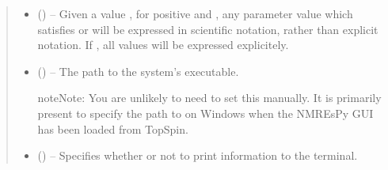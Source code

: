 \documentclass[letterpaper,10pt,english]{sphinxmanual}
\begin{document}
\begin{fulllineitems}
\begin{quote}
\begin{description}
\begin{itemize}
\item {} 
\sphinxAtStartPar
{} (\sphinxstyleliteralemphasis{\sphinxupquote{(}}\sphinxstyleliteralemphasis{\sphinxupquote{, }}\sphinxstyleliteralemphasis{\sphinxupquote{, }}\sphinxstyleliteralemphasis{\sphinxupquote{ (}}\sphinxstyleliteralemphasis{\sphinxupquote{, }}\sphinxstyleliteralemphasis{\sphinxupquote{)}}) – Given a value , for positive  and , any parameter 
value which satisfies  or  will be
expressed in scientific notation, rather than explicit notation.
If , all values will be expressed explicitely.

\item {} 
\sphinxAtStartPar
{} (\sphinxstyleliteralemphasis{\sphinxupquote{, }}) – 
\sphinxAtStartPar
The path to the system’s  executable.

\begin{sphinxadmonition}{note}{Note:}
\sphinxAtStartPar
You are unlikely to need to set this manually. It is primarily
present to specify the path to  on Windows when
the NMR\sphinxhyphen{}EsPy GUI has been loaded from TopSpin.
\end{sphinxadmonition}


\item {} 
\sphinxAtStartPar
{} (\sphinxstyleliteralemphasis{\sphinxupquote{, }}) – Specifies whether or not to print information to the terminal.

\end{itemize}


\end{description}
\end{quote}
\end{fulllineitems}
\end{document}

